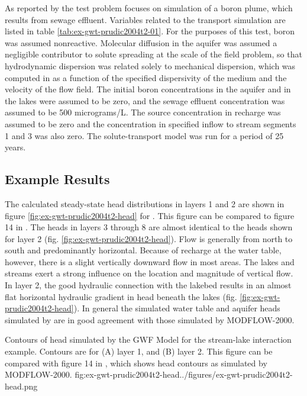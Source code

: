 As reported by \cite{modflowsfr1pack} the test problem focuses on simulation of a boron plume, which results from sewage effluent.  Variables related to the transport simulation are listed in table \ref{tab:ex-gwt-prudic2004t2-01}.  For the purposes of this test, boron was assumed nonreactive. Molecular diffusion in the aquifer was assumed a negligible contributor to solute spreading at the scale of the field problem, so that hydrodynamic dispersion was related solely to mechanical dispersion, which was computed in \mf as a function of the specified dispersivity of the medium and the velocity of the flow field. The initial boron concentrations in the aquifer and in the lakes were assumed to be zero, and the sewage effluent concentration was assumed to be 500 micrograms/L. The source concentration in recharge was assumed to be zero and the concentration in specified inflow to stream segments 1 and 3 was also zero. The solute-transport model was run for a period of 25 years.


\subsection{Example Results}

The calculated steady-state head distributions in layers 1 and 2 are shown in figure \ref{fig:ex-gwt-prudic2004t2-head} for \mf.  This figure can be compared to figure 14 in \cite{modflowsfr1pack}. The heads in layers 3 through 8 are almost identical to the heads shown for layer 2 (fig. \ref{fig:ex-gwt-prudic2004t2-head}).  Flow is generally from north to south and predominantly horizontal. Because of recharge at the water table, however, there is a slight vertically downward flow in most areas. The lakes and streams exert a strong influence on the location and magnitude of vertical flow. In layer 2, the good hydraulic connection with the lakebed results in an almost flat horizontal hydraulic gradient in head beneath the lakes (fig. \ref{fig:ex-gwt-prudic2004t2-head}).  In general the simulated water table and aquifer heads simulated by \mf are in good agreement with those simulated by MODFLOW-2000.

\begin{StandardFigure}{
                                     Contours of head simulated by the \mf GWF Model for the stream-lake interaction example.  Contours are for (A) layer 1, and (B) layer 2.  This figure can be compared with figure 14 in \cite{modflowsfr1pack}, which shows head contours as simulated by MODFLOW-2000.
                                     }{fig:ex-gwt-prudic2004t2-head}{../figures/ex-gwt-prudic2004t2-head.png}
\end{StandardFigure}            

